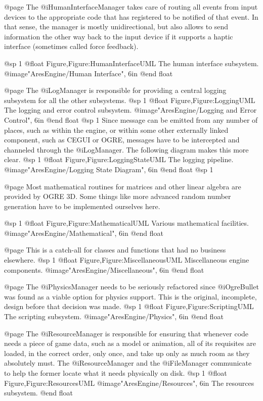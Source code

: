 @page 
The @i{HumanInterfaceManager} takes care of routing all events from input devices to the appropriate code that has registered to be notified of that event. In that sense, the manager is mostly unidirectional, but also allows to send information the other way back to the input device if it supports a haptic interface (sometimes called force feedback).

@sp 1
@float Figure,Figure:HumanInterfaceUML
The human interface subsystem.
@image{"AresEngine/Human Interface", 6in}
@end float

@page 
The @i{LogManager} is responsible for providing a central logging subsystem for all the other subsystems.
@sp 1
@float Figure,Figure:LoggingUML
The logging and error control subsystem.
@image{"AresEngine/Logging and Error Control", 6in}
@end float
@sp 1
Since message can be emitted from any number of places, such as within the engine, or within some other externally linked component, such as CEGUI or OGRE, messages have to be intercepted and channeled through the @i{LogManager}. The following diagram makes this more clear.
@sp 1
@float Figure,Figure:LoggingStateUML
The logging pipeline.
@image{"AresEngine/Logging State Diagram", 6in}
@end float
@sp 1

@page 
Most mathematical routines for matrices and other linear algebra are provided by OGRE 3D. Some things like more advanced random number generation have to be implemented ourselves here.

@sp 1
@float Figure,Figure:MathematicalUML
Various mathematical facilities.
@image{"AresEngine/Mathematical", 6in}
@end float

@page 
This is a catch-all for classes and functions that had no business elsewhere.
@sp 1
@float Figure,Figure:MiscellaneousUML
Miscellaneous engine components.
@image{"AresEngine/Miscellaneous", 6in}
@end float

@page 
The @i{PhysicsManager} needs to be seriously refactored since @i{OgreBullet} was found as a viable option for physics support. This is the original, incomplete, design before that decision was made.
@sp 1
@float Figure,Figure:ScriptingUML
The scripting subsystem.
@image{"AresEngine/Physics", 6in}
@end float

@page 
The @i{ResourceManager} is responsible for ensuring that whenever code needs a piece of game data, such as a model or animation, all of its requisites are loaded, in the correct order, only once, and take up only as much room as they absolutely must. The @i{ResourceManager} and the @i{FileManager} communicate to help the former locate what it needs physically on disk.
@sp 1
@float Figure,Figure:ResourcesUML
@image{"AresEngine/Resources", 6in}
The resources subsystem.
@end float

